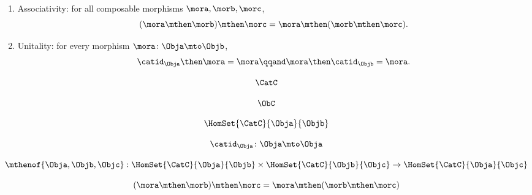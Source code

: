 {\begin{forslides}
\begin{ctdefinition}
\begin{body}
\begin{enumerate}
                \end{enumerate}
                \condit
                \begin{enumerate}
                    \item Associativity: for all composable morphisms $\mora, \morb, \morc$,
                          \begin{equation}
                              (\mora\mthen \morb)
                              \mthen \morc= \mora \mthen (\morb \mthen \morc).
                          \end{equation}
                    \item Unitality: for every morphism $\mora \colon \Obja \mto \Objb$,
                          \begin{equation}
                              \catid_{\Obja} \then \mora = \mora \qqand \mora \then \catid_{\Objb} = \mora.
                          \end{equation}
                \end{enumerate}
            \end{body}
        \end{ctdefinition}

        \begin{equation}
            \label{eq:15}
            \CatC
        \end{equation}

        \begin{equation}
            \label{eq:16}
            \ObC
        \end{equation}

        \begin{equation}
            \label{eq:17}
            \HomSet{\CatC}{\Obja}{\Objb}
        \end{equation}

        \begin{equation}
            \label{eq:18}
            \catid_{\Obja}\colon \Obja \mto \Obja
        \end{equation}

        \begin{equation}
            \label{eq:19}
            \mthenof{\Obja,\Objb,\Objc}: \HomSet{\CatC}{\Obja}{\Objb} \times \HomSet{\CatC}{\Objb}{\Objc}\to \HomSet{\CatC}{\Obja}{\Objc}
        \end{equation}

        \begin{equation}
            \label{eq:20}
            (\mora\mthen \morb)
            \mthen \morc= \mora \mthen (\morb \mthen \morc)
        \end{equation}


\end{forslides}}
